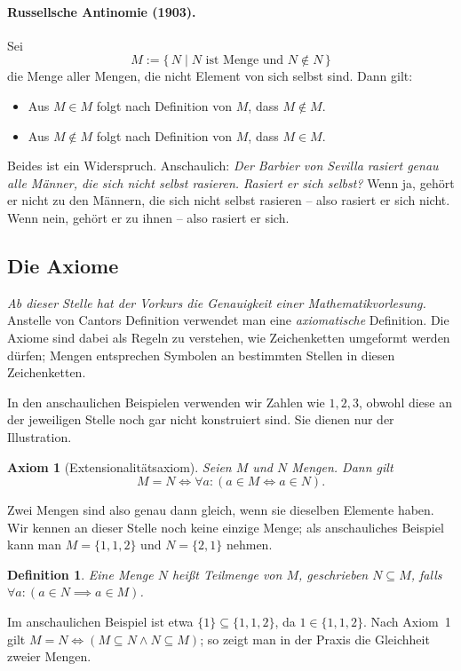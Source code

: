 \documentclass[a4paper]{article}
\theoremstyle{kurzskript}
\newtheorem{definition}[satz]{Definition}
\newtheorem{axiom}{Axiom}                    %
\begin{document}
\paragraph{Russellsche Antinomie (1903).}
Sei
\[
  M := \{\, N \mid N \text{ ist Menge und } N \notin N \,\}
\]
die Menge aller Mengen, die nicht Element von sich selbst sind. Dann gilt:
\begin{itemize}
  \item Aus $M \in M$ folgt nach Definition von $M$, dass $M \notin M$.
  \item Aus $M \notin M$ folgt nach Definition von $M$, dass $M \in M$.
\end{itemize}
Beides ist ein Widerspruch. Anschaulich: \emph{Der Barbier von Sevilla rasiert genau alle Männer, die sich nicht selbst rasieren. Rasiert er sich selbst?} Wenn ja, gehört er nicht zu den Männern, die sich nicht selbst rasieren -- also rasiert er sich nicht. Wenn nein, gehört er zu ihnen -- also rasiert er sich.

\subsection{Die Axiome}

\emph{Ab dieser Stelle hat der Vorkurs die Genauigkeit einer Mathematikvorlesung.} Anstelle von Cantors Definition verwendet man eine \emph{axiomatische} Definition. Die Axiome sind dabei als Regeln zu verstehen, wie Zeichenketten umgeformt werden dürfen; \glqq Mengen\grqq{} entsprechen Symbolen an bestimmten Stellen in diesen Zeichenketten.

In den \glqq anschaulichen Beispielen\grqq{} verwenden wir Zahlen wie $1, 2, 3$, obwohl diese an der jeweiligen Stelle noch gar nicht konstruiert sind. Sie dienen nur der Illustration.

\begin{axiom}[Extensionalitätsaxiom]
Seien $M$ und $N$ Mengen. Dann gilt
\[
  M = N \iff \forall a\colon (a \in M \iff a \in N).
\]
\end{axiom}
Zwei Mengen sind also genau dann gleich, wenn sie dieselben Elemente haben. Wir kennen an dieser Stelle noch keine einzige Menge; als anschauliches Beispiel kann man $M = \{1, 1, 2\}$ und $N = \{2, 1\}$ nehmen.

\begin{definition}
Eine Menge $N$ heißt \emph{Teilmenge} von $M$, geschrieben $N \subseteq M$, falls $\forall a\colon (a \in N \implies a \in M)$.
\end{definition}
Im anschaulichen Beispiel ist etwa $\{1\} \subseteq \{1, 1, 2\}$, da $1 \in \{1, 1, 2\}$. Nach Axiom~1 gilt $M = N \iff (M \subseteq N \land N \subseteq M)$; so zeigt man in der Praxis die Gleichheit zweier Mengen.
\end{document}
